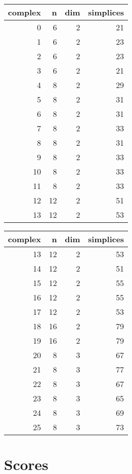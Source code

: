 \documentclass{article}
\begin{document}
\begin{tabular}{rrrr}
\toprule
complex & n & dim & simplices \\
\midrule
0 & 6 & 2 & 21 \\
1 & 6 & 2 & 23 \\
2 & 6 & 2 & 23 \\
3 & 6 & 2 & 21 \\
4 & 8 & 2 & 29 \\
5 & 8 & 2 & 31 \\
6 & 8 & 2 & 31 \\
7 & 8 & 2 & 33 \\
8 & 8 & 2 & 31 \\
9 & 8 & 2 & 33 \\
10 & 8 & 2 & 33 \\
11 & 8 & 2 & 33 \\
12 & 12 & 2 & 51 \\
13 & 12 & 2 & 53 \\
\bottomrule
\end{tabular}
\begin{tabular}{rrrr}
\toprule
complex & n & dim & simplices \\
\midrule
13 & 12 & 2 & 53 \\
14 & 12 & 2 & 51 \\
15 & 12 & 2 & 55 \\
16 & 12 & 2 & 55 \\
17 & 12 & 2 & 53 \\
18 & 16 & 2 & 79 \\
19 & 16 & 2 & 79 \\
20 & 8 & 3 & 67 \\
21 & 8 & 3 & 77 \\
22 & 8 & 3 & 67 \\
23 & 8 & 3 & 65 \\
24 & 8 & 3 & 69 \\
25 & 8 & 3 & 73 \\
\bottomrule
\end{tabular}



\section{Scores}
\end{document}
